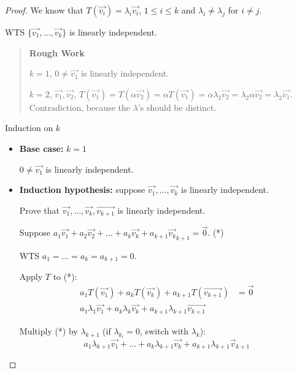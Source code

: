 \documentclass[11pt,fleqn]{book} %
\begin{document}
\begin{proof}
    We know that $T(\overrightarrow{v_i}) = \lambda_i\overrightarrow{v_i}$, $1 \le i \le k$ and $\lambda_i \neq \lambda_j$ for $i \neq j$. 

    WTS $\{ \overrightarrow{v_1}, \dots, \overrightarrow{v_k} \}$ is linearly independent. 

\begin{quote}
    \textbf{Rough Work}
    
    $k = 1$, $0 \neq \overrightarrow{v_1}$ is linearly independent.
    
    $k = 2$, $\overrightarrow{v_1}, \overrightarrow{v_2}$, $T(\overrightarrow{v_1}) = T(\alpha\overrightarrow{v_2}) = \alpha T(\overrightarrow{v_1}) = \alpha\lambda_2 \overrightarrow{v_2} = \lambda_2\alpha\overrightarrow{v_2} = \lambda_2\overrightarrow{v_1}$. Contradiction, because the $\lambda$'s should be distinct. 
\end{quote}

    Induction on $k$
    
    \begin{itemize}
        \item \textbf{Base case:} $k = 1$

        $0 \neq \overrightarrow{v_1}$ is linearly independent.
        
        \item \textbf{Induction hypothesis:} suppose $\overrightarrow{v_1}, \dots, \overrightarrow{v_k}$ is linearly independent. 
    
        Prove that $\overrightarrow{v_1}, \dots, \overrightarrow{v_k}, \overrightarrow{v_{k+1}}$ is linearly independent. 

    Suppose $a_1\overrightarrow{v_1} + a_2\overrightarrow{v_2} + \dots + a_k\overrightarrow{v_k} + a_{k+1}\overrightarrow{v_k}_{k+1} = \overrightarrow{0}$. (*)

    WTS $a_1 = \dots = a_k = a_{k+1} = 0$. 

    Apply $T$ to (*): 
    \begin{align*}
        a_1T(\overrightarrow{v_1}) + a_kT(\overrightarrow{v_k}) +a_{k+1}T(\overrightarrow{v_{k+1}}) 
        &= \overrightarrow{0}
        \\
        a_1\lambda_1\overrightarrow{v_1} +a_k\lambda_k\overrightarrow{v_k} +a_{k+1}\lambda_{k+1}\overrightarrow{v_{k+1}} 
        \label{eq:1}\tag{1}
    \end{align*}

    Multiply (*) by $\lambda_{k+1}$ (if $\lambda_{k_i} = 0$, switch with $\lambda_k$): 
    \begin{equation*}
        a_1\lambda_{k+1}\overrightarrow{v_1} + \dots + a_k\lambda_{k+1}\overrightarrow{v_k} + a_{k+1}\lambda_{k+1}\overrightarrow{v}_{k+1}
        \label{eq:2}\tag{2}
    \end{equation*}


\end{itemize}
\end{proof}
\end{document}
